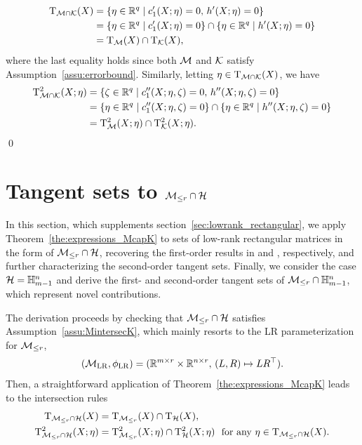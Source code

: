\begin{align}
    \mathrm{T}_{\mathcal{M}\cap\mathcal{K}}(X) &= \{\eta\in\mathbb{R}^q\mid c_1^\prime(X;\eta)=0,\,h^\prime(X;\eta)=0\}    \nonumber
    \\
    &= \{\eta\in\mathbb{R}^q\mid c_1^\prime(X;\eta)=0\}\cap\{\eta\in\mathbb{R}^q\mid h^\prime(X;\eta)=0\}   \nonumber
    \\
    &= \mathrm{T}_{\mathcal{M}}(X)\cap\mathrm{T}_{\mathcal{K}}(X),  \nonumber
\end{align}
where the last equality holds since both $\mathcal{M}$ and $\mathcal{K}$ satisfy Assumption~\ref{assu:errorbound}. Similarly, letting $\eta\in\mathrm{T}_{\mathcal{M}\cap\mathcal{K}}(X)$, we have
\begin{align}
    \mathrm{T}^2_{\mathcal{M}\cap\mathcal{K}}(X;\eta) &= \{\zeta\in\mathbb{R}^q\mid c_1^{\prime\prime}(X;\eta,\zeta)=0,\,h^{\prime\prime}(X;\eta,\zeta)=0\}    \nonumber
    \\
    &= \{\eta\in\mathbb{R}^q\mid c_1^{\prime\prime}(X;\eta,\zeta)=0\}\cap\{\eta\in\mathbb{R}^q\mid h^{\prime\prime}(X;\eta,\zeta)=0\}   \nonumber
    \\
    &= \mathrm{T}^2_{\mathcal{M}}(X;\eta)\cap\mathrm{T}^2_{\mathcal{K}}(X;\eta). \nonumber
\end{align}
\qed

\section{Tangent sets to $\mathcal{M}_{\le r}\cap\mathcal{H}$}\label{app:McapH_application}
In this section, which supplements section~\ref{sec:lowrank_rectangular}, we apply Theorem~\ref{the:expressions_McapK} to sets of low-rank rectangular matrices in the form of $\mathcal{M}_{\le r}\cap\mathcal{H}$, recovering the first-order results in \cite{li2023normalboundedaffine} and \cite{yang2025spacedecouple}, respectively, and further characterizing the second-order tangent sets. Finally, we consider the case $\mathcal{H} = \mathbb{H}^n_{m-1}$ and derive the first- and second-order tangent sets of $\mathcal{M}_{\le r} \cap \mathbb{H}^n_{m-1}$, which represent novel contributions.




The derivation proceeds by checking that $\mathcal{M}_{\le r}\cap\mathcal{H}$ satisfies Assumption~\ref{assu:MintersecK}, which mainly resorts to the LR parameterization for $\mathcal{M}_{\le r}$,
\begin{equation}\label{eq:LR_para}
(\mathcal{M}_{\mathrm{LR}},\phi_{\mathrm{LR}})=(\mathbb{R}^{m\times r}\times \mathbb{R}^{n\times r},\, (L,R)\mapsto LR^\top).
\end{equation}
Then, a straightforward application of Theorem~\ref{the:expressions_McapK} leads to the intersection rules
\begin{equation}\label{eq:expressions_McapH}
\begin{aligned}
    \Btangent_{\boundedrank\cap\hanifold}(X) &= \Btangent_{\boundedrank}(X)\cap\Btangent_{\hanifold}(X),
    \\
    \tangenttwo_{\boundedrank\cap\hanifold}(X;\eta) &= \tangenttwo_{\boundedrank}(X;\eta)\cap\tangenttwo_{\hanifold}(X;\eta)\ \ \text{for any}\ \eta\in\Btangent_{\boundedrank\cap\hanifold}(X).
\end{aligned}
\end{equation}

